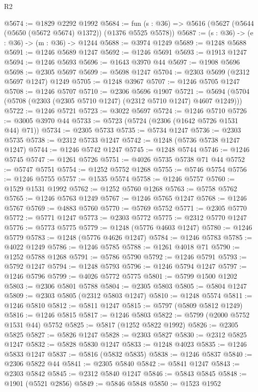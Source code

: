 \begin{lexlean}{R2}
\begin{coremodule}
@5674 := @1829 @2292 @1992
@5684 := fun (s : @36) => @5616 (@5627 (@5644 (@5650 (@5672 @5674) @1372)) (@1376 @5525 @5578))
@5687 := (s : @36) -> (e : @36) -> (m : @36) -> @1244
@5688 := @3974 @1249
@5689 := @1248 @5688
@5691 := @1246 @5689 @1247
@5692 := @1246 @5691
@5693 := @1913 @1247
@5694 := @1246 @5693
@5696 := @1643 @3970 @44
@5697 := @1908 @5696
@5698 := @2305 @5697
@5699 := @5698 @1247
@5704 := @2303 @5699 (@2312 @5697 @1247) @1249
@5705 := @1248 @3967
@5707 := @1246 @5705 @1247
@5708 := @1246 @5707
@5710 := @2306 @5696 @1907
@5721 := @5694 (@5704 (@5708 (@2303 (@2305 @5710 @1247) (@2312 @5710 @1247) @4607 @1249)))
@5722 := @1246 @5721
@5723 := @3022 @5697
@5724 := @1246 @5710
@5726 := @3005 @3970 @44
@5733 := @5723 (@5724 (@2306 (@1642 @5726 @1531 @44) @71))
@5734 := @2305 @5733
@5735 := @5734 @1247
@5736 := @2303 @5735
@5738 := @2312 @5733 @1247
@5742 := @1248 (@5736 @5738 @1247 @1247)
@5744 := @1246 @5742 @1247
@5745 := @1248 @5744
@5746 := @1246 @5745
@5747 := @1261 @5726
@5751 := @4026 @5735 @5738 @71 @44
@5752 := @5747 @5751
@5754 := @1252 @5752 @1268
@5755 := @5746 @5754
@5756 := @1246 @5755
@5757 := @1535 @5574
@5758 := @1246 @5757
@5760 := @1529 @1531 @1992
@5762 := @1252 @5760 @1268
@5763 := @5758 @5762
@5765 := @1246 @5763 @1249
@5767 := @1246 @5765 @1247
@5768 := @1246 @5767
@5769 := @4883 @5760
@5770 := @5769 @5752
@5771 := @2305 @5770
@5772 := @5771 @1247
@5773 := @2303 @5772
@5775 := @2312 @5770 @1247
@5776 := @5773 @5775
@5779 := @1248 (@5776 @4603 @1247)
@5780 := @1246 @5779
@5783 := @1248 (@5776 @4626 @1247)
@5784 := @1246 @5783
@5785 := @4022 @1249
@5786 := @1246 @5785
@5788 := @1261 @4018 @71
@5790 := @1252 @5788 @1268
@5791 := @5786 @5790
@5792 := @1246 @5791
@5793 := @5792 @1247
@5794 := @1248 @5793
@5796 := @1246 @5794 @1247
@5797 := @1246 @5796
@5799 := @4026 @5772 @5775
@5801 := @5799 @1500 @1202
@5803 := @2306 @5801 @5788
@5804 := @2305 @5803
@5805 := @5804 @1247
@5809 := @2303 @5805 (@2312 @5803 @1247)
@5810 := @1248 @5574
@5811 := @1246 @5810
@5812 := @5811 @1247
@5815 := @5797 (@5809 @5812 @1249)
@5816 := @1246 @5815
@5817 := @1246 @5803
@5822 := @5799 (@2000 @5752 @1531 @44) @5752
@5825 := @5817 (@1252 @5822 @1992)
@5826 := @2305 @5825
@5827 := @5826 @1247
@5828 := @2303 @5827
@5830 := @2312 @5825 @1247
@5832 := @5828 @5830 @1247
@5833 := @1248 @4023
@5835 := @1246 @5833 @1247
@5837 := @5816 (@5832 @5835)
@5838 := @1246 @5837
@5840 := @2306 @5822 @44
@5841 := @2305 @5840
@5842 := @5841 @1247
@5843 := @2303 @5842
@5845 := @2312 @5840 @1247
@5846 := @5843 @5845
@5848 := @1901 (@5521 @2856)
@5849 := @5846 @5848
@5850 := @1523 @1952

\end{coremodule}
\end{lexlean}
